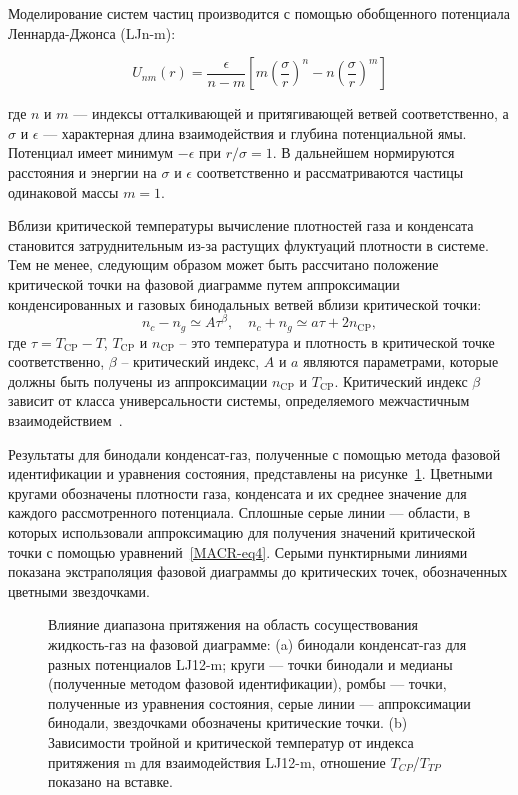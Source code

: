 Моделирование систем частиц производится с помощью обобщенного потенциала Леннарда-Джонса (LJn-m):

\begin{equation}
	U_{n m}(r)=\frac{\epsilon}{n-m}\left[m\left(\frac{\sigma}{r}\right)^{n}-n\left(\frac{\sigma}{r}\right)^{m}\right]
	\label{LJnm}
\end{equation}

где $n$ и $m$ — индексы отталкивающей и притягивающей ветвей соответственно, а $\sigma$ и $\epsilon$ — характерная длина взаимодействия и глубина потенциальной ямы.
Потенциал имеет минимум $-\epsilon$ при $r/\sigma=1$.
В дальнейшем нормируются расстояния и энергии на $\sigma$ и $\epsilon$ соответственно и рассматриваются частицы одинаковой массы $m=1$.

Вблизи критической температуры вычисление плотностей газа и конденсата становится затруднительным из-за растущих флуктуаций плотности в системе.
Тем не менее, следующим образом может быть рассчитано положение критической точки на фазовой диаграмме путем аппроксимации конденсированных и газовых бинодальных ветвей вблизи критической точки:
\begin{equation}
	n_{c}-n_{g} \simeq A \tau^{\beta}, \quad n_{c}+n_{g} \simeq a \tau+2 n_{\mathrm{CP}},
	\label{MACR-eq4}
\end{equation}
где $\tau=T_{\mathrm{CP}}-T$, $T_{\mathrm{CP}}$ и $n_{\mathrm{CP}}$ -- это температура и 
плотность в критической точке соответственно, $\beta$ -- критический индекс, $A$ и $a$ являются параметрами, которые должны быть получены из аппроксимации $n_{\mathrm{CP}}$ и $T_{\mathrm{CP}}$.
Критический индекс $\beta$ зависит от класса универсальности системы, определяемого межчастичным взаимодействием~\cite{10.1103/physrevlett.89.025703}.

Результаты для бинодали конденсат-газ, полученные с помощью метода фазовой идентификации и уравнения состояния, представлены на рисунке~\ref{nmp}.
Цветными кругами обозначены плотности газа, конденсата и их среднее значение для каждого рассмотренного потенциала. 
Сплошные серые линии — области, в которых использовали аппроксимацию для получения значений критической точки с помощью уравнений~\ref{MACR-eq4}. 
Серыми пунктирными линиями показана экстраполяция фазовой диаграммы до критических точек, обозначенных цветными звездочками.

\begin{figure}[!h]
	\begin{center}
		\caption{Влияние диапазона притяжения на область сосуществования жидкость-газ на фазовой диаграмме: (a) бинодали конденсат-газ для разных потенциалов LJ12-m; круги — точки бинодали и медианы (полученные методом фазовой идентификации), ромбы — точки, полученные из уравнения состояния, серые линии — аппроксимации бинодали, звездочками обозначены критические точки.
			(b) Зависимости тройной и критической температур от индекса притяжения m для взаимодействия LJ12-m, отношение $T_{CP}$/$T_{TP}$ показано на вставке.}
		\label{nmp}
	\end{center}
\end{figure}

